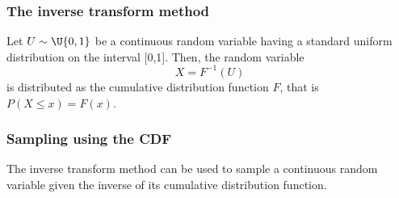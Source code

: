 \documentclass[10pt]{beamer}
\begin{document}
\begin{frame}
\frametitle{The inverse transform method}

\begin{theorem}
Let $U \sim \U{0,1}$ be a continuous random variable having a standard uniform distribution on the interval [0,1]. Then, the random variable
\begin{equation*}
X = F^{-1}(U)
\end{equation*}
is distributed as the cumulative distribution function  $F$, that is $P(X \leq x) = F(x)$.
\end{theorem}


\end{frame}

\begin{frame}
\frametitle{Sampling using the CDF}

The inverse transform method can be used to sample a continuous random variable
given the inverse of its cumulative distribution function.

\ 


\end{frame}
\end{document}
